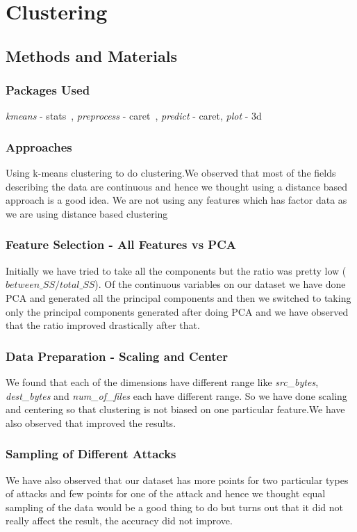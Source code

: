 \documentclass[11pt]{article}
\begin{document}
\section{Clustering}
\label{Sec:Clust}

\subsection{Methods and Materials}
\subsubsection{Packages Used}
{\it kmeans} - stats~\cite{stats}, {\it preprocess} - caret~\cite{caret}, {\it predict} - caret, {\it plot} - 3d~\cite{3d}

\subsubsection{Approaches}
Using k-means clustering to do clustering.We observed that most of the fields describing the data are continuous and hence we thought using a distance based approach is a good idea.
We are not using any features which has factor data as we are using distance based clustering

\subsubsection{Feature Selection - All Features vs PCA}
Initially we have tried to take all the components but the ratio was pretty low ($between\_SS / total\_SS$).
Of the continuous variables on our dataset we have done PCA and generated all the principal components and then we switched to taking only the principal components generated after doing PCA and we have observed that the ratio improved drastically after that.

\subsubsection{Data Preparation - Scaling and Center}
We found that each of the dimensions have different range like {\it src\_bytes}, {\it dest\_bytes} and {\it num\_of\_files} each have different range. So we have done scaling and centering so that clustering is not biased on one particular feature.We have also observed that improved the results.

\subsubsection{Sampling of Different Attacks}
We have also observed that our dataset has more points for two particular types of attacks and few points for one of the attack and hence we thought equal sampling of the data would be a good thing to do but turns out that it did not really affect the result, the accuracy did not improve.
\end{document}
